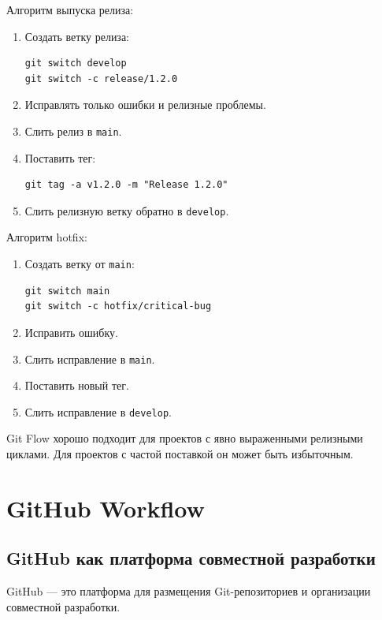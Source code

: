 \documentclass[12pt,a4paper]{article}
\begin{document}
Алгоритм выпуска релиза:

\begin{enumerate}
    \item Создать ветку релиза:
\begin{lstlisting}
git switch develop
git switch -c release/1.2.0
\end{lstlisting}

    \item Исправлять только ошибки и релизные проблемы.
    \item Слить релиз в \texttt{main}.
    \item Поставить тег:
\begin{lstlisting}
git tag -a v1.2.0 -m "Release 1.2.0"
\end{lstlisting}

    \item Слить релизную ветку обратно в \texttt{develop}.
\end{enumerate}

Алгоритм hotfix:

\begin{enumerate}
    \item Создать ветку от \texttt{main}:
\begin{lstlisting}
git switch main
git switch -c hotfix/critical-bug
\end{lstlisting}

    \item Исправить ошибку.
    \item Слить исправление в \texttt{main}.
    \item Поставить новый тег.
    \item Слить исправление в \texttt{develop}.
\end{enumerate}

Git Flow хорошо подходит для проектов с явно выраженными релизными циклами. Для проектов с частой поставкой он может быть избыточным.

\section{GitHub Workflow}

\subsection{GitHub как платформа совместной разработки}

GitHub --- это платформа для размещения Git-репозиториев и организации совместной разработки.
\end{document}
